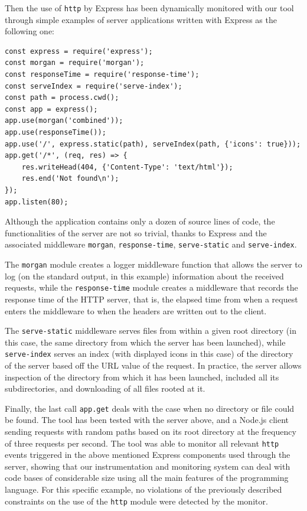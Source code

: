 Then the use of \lstinline{http} by Express has been dynamically monitored with our tool through simple
examples of server applications written with Express as the following one:
\begin{lstlisting}
const express = require('express');
const morgan = require('morgan');
const responseTime = require('response-time');
const serveIndex = require('serve-index');
const path = process.cwd();
const app = express();
app.use(morgan('combined'));
app.use(responseTime());
app.use('/', express.static(path), serveIndex(path, {'icons': true}));
app.get('/*', (req, res) => {
    res.writeHead(404, {'Content-Type': 'text/html'});
    res.end('Not found\n');
});
app.listen(80);
\end{lstlisting}
Although the application contains only a dozen of source lines of code, the
functionalities of the server are not so trivial, thanks to Express and the
associated middleware \lstinline{morgan}, \lstinline{response-time}, \lstinline{serve-static} and
\lstinline{serve-index}.

The \lstinline{morgan} module creates a logger middleware function that allows the server to log (on the standard output, in this example)
information about the received requests, while the \lstinline{response-time} module
creates a middleware that records the response time of the HTTP server, that is, the elapsed time from when a
request enters the middleware to when the headers are written out to the client.

The  \lstinline{serve-static} middleware serves files from within a given root directory (in this case, the same directory
from which the server has been launched), while \lstinline{serve-index} serves an index (with displayed icons in this case)
of the directory of the server based off the URL value of the request. In practice, the server allows inspection of the directory
from which it has been launched, included all its subdirectories, and downloading of all files rooted at it.

Finally, the last call \lstinline{app.get} deals with the case when no directory or file could be found.
The tool has been tested with the server above, and a Node.js client sending requests with random  paths based on its root directory at the frequency of three requests per second.
The tool was able to monitor all relevant \lstinline{http} events triggered in the above mentioned Express components used through the server, showing that our instrumentation and monitoring system can deal with code bases of considerable size using all the main features of the programming language.
For this specific example, no violations of the previously described constraints on the use of the \lstinline{http} module were detected by the monitor.


